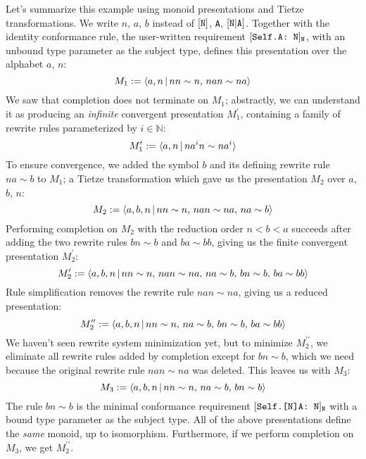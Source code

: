 \documentclass[../generics]{subfiles}
\begin{document}
\begin{example}
Let's summarize this example using monoid presentations and Tietze transformations. We write $n$, $a$, $b$ instead of $[\texttt{N}]$, \texttt{A}, $[\texttt{N}|\texttt{A}]$. Together with the identity conformance rule, the user-written requirement $[\texttt{Self.A:~N}]_\texttt{N}$, with an unbound type parameter as the subject type, defines this presentation over the alphabet $a$, $n$:
\[M_1 := \langle a,n\,|\,nn\sim n,\,nan\sim na\rangle\]
We saw that completion does not terminate on $M_1$; abstractly, we can understand it as producing an \emph{infinite} convergent presentation $M_1^\prime$, containing a family of rewrite rules parameterized by $i\in\mathbb{N}$:
\[M_1^\prime := \langle a,n\,|\,na^in\sim na^i\rangle\]
To ensure convergence, we added the symbol $b$ and its defining rewrite rule $na\sim b$ to $M_1$; a Tietze transformation which gave us the presentation $M_2$ over $a$, $b$, $n$:
\[M_2 := \langle a,b,n\,|\,nn\sim n,\,nan\sim na,\,na\sim b\rangle\]
Performing completion on $M_2$ with the reduction order $n<b<a$ succeeds after adding the two rewrite rules $bn\sim b$ and $ba\sim bb$, giving us the finite convergent presentation $M_2^\prime$:
\[M_2^\prime := \langle a,b,n\,|\,nn\sim n,\,nan\sim na,\,na\sim b,\,bn\sim b,\,ba\sim bb\rangle\]
Rule simplification removes the rewrite rule $nan\sim na$, giving us a reduced presentation:
\[M_2^{\prime\prime} := \langle a,b,n\,|\,nn\sim n,\,na\sim b,\,bn\sim b,\,ba\sim bb\rangle\]
We haven't seen rewrite system minimization yet, but to minimize $M_2^{\prime\prime}$, we eliminate all rewrite rules added by completion except for $bn\sim b$, which we need because the original rewrite rule $nan\sim na$ was deleted. This leaves us with $M_3$:
\[M_3:=\langle a,b,n\,|\,nn\sim n,\,na\sim b,\,bn\sim b\rangle\]
The rule $bn\sim b$ is the minimal conformance requirement $[\texttt{Self.[N]A:~N}]_\texttt{N}$ with a bound type parameter as the subject type. All of the above presentations define the \emph{same} monoid, up to isomorphism. Furthermore, if we perform completion on $M_3$, we get $M_2^{\prime\prime}$.
\end{example}
\end{document}

